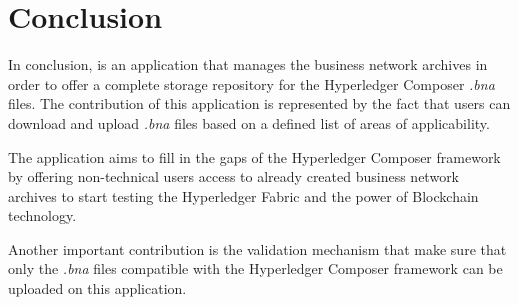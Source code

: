 \chapter{Conclusion}
\label{chapter:conclusion}
In conclusion, \textbf{\project} is an application that manages the business network archives in order to offer a complete storage repository for the Hyperledger Composer \emph{.bna} files.
The contribution of this application is represented by the fact that users can download and upload \emph{.bna} files based on a defined list of areas of applicability.

The application aims to fill in the gaps of the Hyperledger Composer framework by offering non-technical users access to already created business network archives to start testing the Hyperledger Fabric and the power of Blockchain technology.

Another important contribution is the validation mechanism that make sure that only the \emph{.bna} files compatible with the Hyperledger Composer framework can be uploaded on this application.